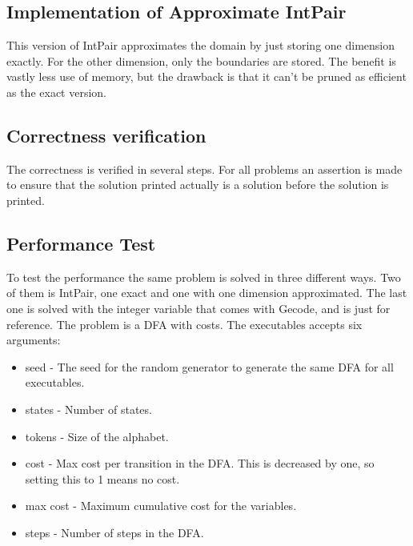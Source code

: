 \documentclass[a4paper,11pt]{article}
\begin{document}
\subsection{Implementation of Approximate IntPair}
This version of IntPair approximates the domain by just storing one dimension exactly. For the other dimension, only the boundaries are stored. The benefit is vastly less use of memory, but the drawback is that it can't be pruned as efficient as the exact version. 

\subsection{Correctness verification}
The correctness is verified in several steps. For all problems an assertion is made to ensure that the solution printed actually is a solution before the solution is printed. 

\subsection{Performance Test}
To test the performance the same problem is solved in three different ways. Two of them is IntPair, one exact and one with one dimension approximated. The last one is solved with the integer variable that comes with Gecode, and is just for reference. The problem is a DFA with costs. The executables accepts six arguments: 
\begin{itemize}
\item{seed} - The seed for the random generator to generate the same DFA for all executables.
\item{states} - Number of states.
\item{tokens} - Size of the alphabet.
\item{cost} - Max cost per transition in the DFA. This is decreased by one, so setting this to 1 means no cost.
\item{max cost} - Maximum cumulative cost for the variables.
\item{steps} - Number of steps in the DFA.
\end{itemize}
\end{document}
